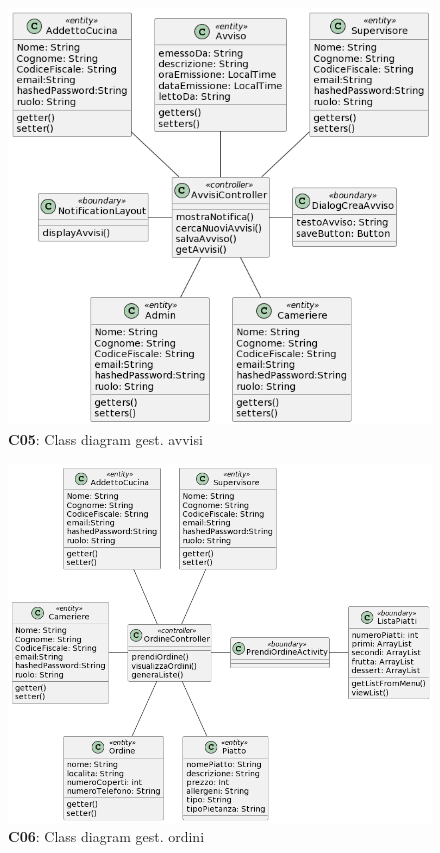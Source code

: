     \begin{figure}[H]
        \centering
        \includegraphics[scale=0.5]{assets/diagrammi/Class diagram di analisi/Gestione Avvisi.png}
        \caption{\textbf{C05}: Class diagram gest. avvisi}\label{fig:Avvisi}
    \end{figure}

    \begin{figure}[H]
        \centering
        \includegraphics[scale=0.5]{assets/diagrammi/Class diagram di analisi/Gestione ordini.png}
        \caption{\textbf{C06}: Class diagram gest. ordini}\label{fig:Ordini}
    \end{figure}

